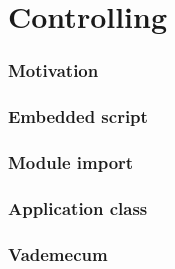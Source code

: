 \part{Controlling}
\section{Motivation}


\section{Embedded script}

\section{Module import}

\section{Application class}

\section{Vademecum}

%
